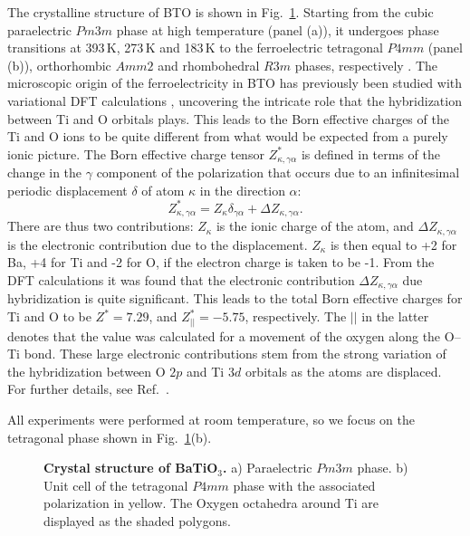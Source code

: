 The crystalline structure of BTO is shown in Fig.~\ref{fig:BTO_crystal}.
Starting from the cubic paraelectric $Pm3m$ phase at high temperature (panel (a)), it undergoes phase transitions at 393\,K, 273\,K and 183\,K to the ferroelectric tetragonal $P4mm$ (panel (b)), orthorhombic $Amm2$ and rhombohedral $R3m$ phases, respectively \cite{Mason1948, VonHippel1950, Marton2010}.
The microscopic origin of the ferroelectricity in BTO has previously been studied with variational DFT calculations \cite{Ghosez1995}, uncovering the intricate role that the hybridization between Ti and O orbitals plays.
This leads to the Born effective charges of the Ti and O ions to be quite different from what would be expected from a purely ionic picture.
The Born effective charge tensor $Z^*_{\kappa, \gamma\alpha}$ is defined in terms of the change in the $\gamma$ component of the polarization that occurs due to an infinitesimal periodic displacement $\delta$ of atom $\kappa$ in the direction $\alpha$:
\begin{equation}
Z^*_{\kappa, \gamma\alpha} = Z_{\kappa} \delta_{\gamma\alpha} + \Delta Z_{\kappa, \gamma\alpha}.
\end{equation}
There are thus two contributions: $Z_{\kappa}$ is the ionic charge of the atom, and $\Delta Z_{\kappa, \gamma\alpha}$ is the electronic contribution due to the displacement.
$Z_{\kappa}$ is then equal to +2 for Ba, +4 for Ti and -2 for O, if the electron charge is taken to be -1.
From the DFT calculations it was found that the electronic contribution $\Delta Z_{\kappa, \gamma\alpha}$ due hybridization is quite significant.
This leads to the total Born effective charges for Ti and O to be $Z^* = 7.29$, and $Z^*_{||} = -5.75$, respectively.
The $||$ in the latter denotes that the value was calculated for a movement of the oxygen along the O--Ti bond.
These large electronic contributions stem from the strong variation of the hybridization between O $2p$ and Ti $3d$ orbitals as the atoms are displaced.
For further details, see Ref.~\cite{Ghosez1995}.

All experiments were performed at room temperature, so we focus on the tetragonal phase shown in Fig.~\ref{fig:BTO_crystal}(b).
\begin{figure}[h]
	\caption{\label{fig:BTO_crystal}{\bf Crystal structure of BaTiO$_3$.} a) Paraelectric $Pm3m$ phase. b) Unit cell of the tetragonal $P4mm$ phase with the associated polarization in yellow. The Oxygen octahedra around Ti are displayed as the shaded polygons.}
\end{figure}

